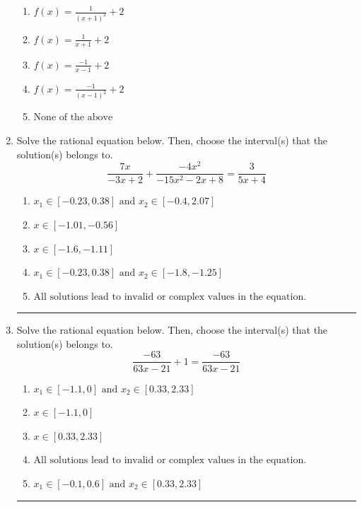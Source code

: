 \documentclass[14pt]{extbook}
\newcommand{\litem}[1]{\item#1\hspace*{-1cm}\rule{\textwidth}{0.4pt}}
\begin{document}
\begin{enumerate}
{\begin{center}
\end{center}
\begin{enumerate}[label=\Alph*.]
\item \( f(x) = \frac{1}{(x + 1)^2} + 2 \)
\item \( f(x) = \frac{1}{x + 1} + 2 \)
\item \( f(x) = \frac{-1}{x - 1} + 2 \)
\item \( f(x) = \frac{-1}{(x - 1)^2} + 2 \)
\item \( \text{None of the above} \)

\end{enumerate} }
\litem{
Solve the rational equation below. Then, choose the interval(s) that the solution(s) belongs to.\[ \frac{7x}{-3x + 2} + \frac{-4x^{2}}{-15x^{2} -2 x + 8} = \frac{3}{5x + 4} \]\begin{enumerate}[label=\Alph*.]
\item \( x_1 \in [-0.23, 0.38] \text{ and } x_2 \in [-0.4,2.07] \)
\item \( x \in [-1.01,-0.56] \)
\item \( x \in [-1.6,-1.11] \)
\item \( x_1 \in [-0.23, 0.38] \text{ and } x_2 \in [-1.8,-1.25] \)
\item \( \text{All solutions lead to invalid or complex values in the equation.} \)

\end{enumerate} }
\litem{
Solve the rational equation below. Then, choose the interval(s) that the solution(s) belongs to.\[ \frac{-63}{63x -21} + 1 = \frac{-63}{63x -21} \]\begin{enumerate}[label=\Alph*.]
\item \( x_1 \in [-1.1, 0] \text{ and } x_2 \in [0.33,2.33] \)
\item \( x \in [-1.1,0] \)
\item \( x \in [0.33,2.33] \)
\item \( \text{All solutions lead to invalid or complex values in the equation.} \)
\item \( x_1 \in [-0.1, 0.6] \text{ and } x_2 \in [0.33,2.33] \)


\end{enumerate}}
\end{enumerate}
\end{document}
